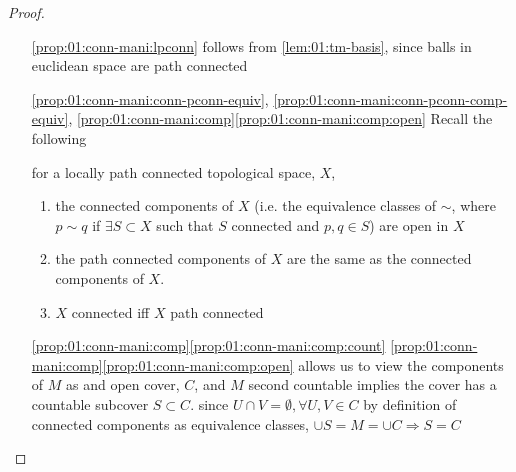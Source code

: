 \begin{proof}\
  \begin{itemize}
  \item[\ref{prop:01:conn-mani:lpconn}]
    follows from \ref{lem:01:tm-basis},
    since balls in euclidean space are path connected
  \item[\ref{prop:01:conn-mani:conn-pconn-equiv},
    \ref{prop:01:conn-mani:conn-pconn-comp-equiv},
    \ref{prop:01:conn-mani:comp}\ref{prop:01:conn-mani:comp:open}]
    Recall the following
    \begin{fact}
      for a locally path connected topological space, $X$,
      \begin{enumerate}[label=(\alph*)]
      \item
        the connected components of $X$
        (i.e. the equivalence classes of $\sim$, where
        $p\sim q$ if $\exists S\subset X$ such that
        $S$ connected and $p, q\in S$)
        are open in $X$
      \item
        the path connected components of $X$ are the same
        as the connected components of $X$.
      \item
        $X$ connected iff $X$ path connected
      \end{enumerate}
    \end{fact}
  \item[\ref{prop:01:conn-mani:comp}\ref{prop:01:conn-mani:comp:count}]
    \ref{prop:01:conn-mani:comp}\ref{prop:01:conn-mani:comp:open}
    allows us to view the components of $M$ as and open cover, $C$,
    and $M$ second countable implies
    the cover has a countable subcover $S\subset C$.
    since $U\cap V=\emptyset, \forall U,V\in C$
    by definition of connected components as equivalence classes,
    $\cup S = M = \cup C \Rightarrow S=C$
  \end{itemize}
\end{proof}

